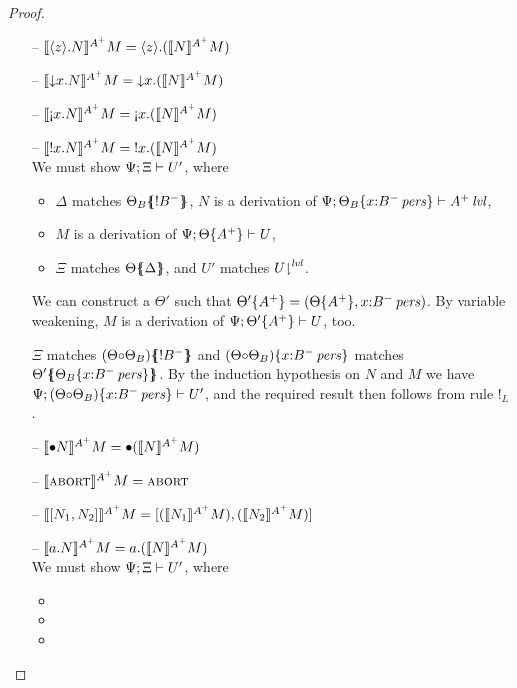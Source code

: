 \begin{proof}
\begin{itemize}
\item[--] $\lsubsta{\tetap{z}{N}}{M}{A^+} 
           = \tetap{z}{(\lsubsta{N}{M}{A^+})}$
\item[--] $\lsubsta{\tdownl{x}{N}}{M}{A^+} 
           = \tdownl{x}{(\lsubsta{N}{M}{A^+})}$
\item[--] $\lsubsta{\tgnabl{x}{N}}{M}{A^+} 
           = \tgnabl{x}{(\lsubsta{N}{M}{A^+})}$
\item[--] $\lsubsta{\tbangl{x}{N}}{M}{A^+} 
           = \tbangl{x}{(\lsubsta{N}{M}{A^+})}$\\
  We must show $\foc{\Psi}{\Xi}{U'}$, where
  \begin{itemize}
  \item $\Delta$ matches $\frameoff{\Theta_B}{{!}B^-}$, 
    $N$ is a derivation of
    $\foc{\Psi}{\tackon{\Theta_B}{\ispers{x{:}B^-}}}{\islvl{A^+}}$,
  \item $M$ is a derivation of $\foc{\Psi}{\tackon{\Theta}{A^+}}{U}$,
  \item $\Xi$ matches $\frameoff{\Theta}{\Delta}$, and $U'$ matches 
    $\restrictfrom{U}{\mlvl}$.
  \end{itemize}
  We can construct a $\Theta'$ such that 
  $\tackon{\Theta'}{A^+} = (\tackon{\Theta}{A^+},x{:}\ispers{B^-})$. By
  variable weakening, $M$ is a derivation of 
  $\foc{\Psi}{\tackon{\Theta'}{A^+}}{U}$, too.

  $\Xi$ matches $\frameoff{(\Theta {\circ} \Theta_B)}{{!}B^-}$ and
  $\tackon{(\Theta {\circ} \Theta_B)}{x{:}\ispers{B^-}}$ matches
  $\frameoff{\Theta'}{\tackon{\Theta_B}{x{:}\ispers{B^-}}}$.
  By the induction hypothesis on $N$ and $M$ we have 
  $\foc{\Psi}{\tackon{(\Theta {\circ}
      \Theta_B)}{x{:}\ispers{B^-}}}{U'}$, and the required
  result then follows from rule ${!}_L$. 
\item[--] $\lsubsta{\tfusel{N}}{M}{A^+} = \tfusel{(\lsubsta{N}{M}{A^+})}$
\item[--] $\lsubsta{\tabort}{M}{A^+} = \tabort$
\item[--] $\lsubsta{\toplusl{N_1}{N_2}}{M}{A^+} = \toplusl{(\lsubsta{N_1}{M}{A^+})}{(\lsubsta{N_2}{M}{A^+})}$
\item[--] $\lsubsta{\texistsl{a}{N}}{M}{A^+} = \texistsl{a}{(\lsubsta{N}{M}{A^+})}$\\
  We must show $\foc{\Psi}{\Xi}{U'}$, where
  \begin{itemize}
  \item
  \item
  \item
  \end{itemize}


\end{itemize}
\end{proof}
